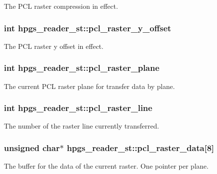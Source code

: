 The PCL raster compression in effect. 
\subsubsection[pcl\_\-raster\_\-y\_\-offset]{\setlength{\rightskip}{0pt plus 5cm}int {\bf hpgs\_\-reader\_\-st::pcl\_\-raster\_\-y\_\-offset}}\label{structhpgs__reader__st_c65b9460273bfccc7b48a152c617cf24}


The PCL raster y offset in effect. 
\subsubsection[pcl\_\-raster\_\-plane]{\setlength{\rightskip}{0pt plus 5cm}int {\bf hpgs\_\-reader\_\-st::pcl\_\-raster\_\-plane}}\label{structhpgs__reader__st_6601c9ae20b7b0eb8282c64dda3481ba}


The current PCL raster plane for transfer data by plane. 
\subsubsection[pcl\_\-raster\_\-line]{\setlength{\rightskip}{0pt plus 5cm}int {\bf hpgs\_\-reader\_\-st::pcl\_\-raster\_\-line}}\label{structhpgs__reader__st_6ba17133f382263f5cbc5545be459aed}


The number of the raster line currently transferred. 
\subsubsection[pcl\_\-raster\_\-data]{\setlength{\rightskip}{0pt plus 5cm}unsigned char$\ast$ {\bf hpgs\_\-reader\_\-st::pcl\_\-raster\_\-data}[8]}\label{structhpgs__reader__st_b11a72c0a62466ebd86d30726c37d8ba}


The buffer for the data of the current raster. One pointer per plane. 

